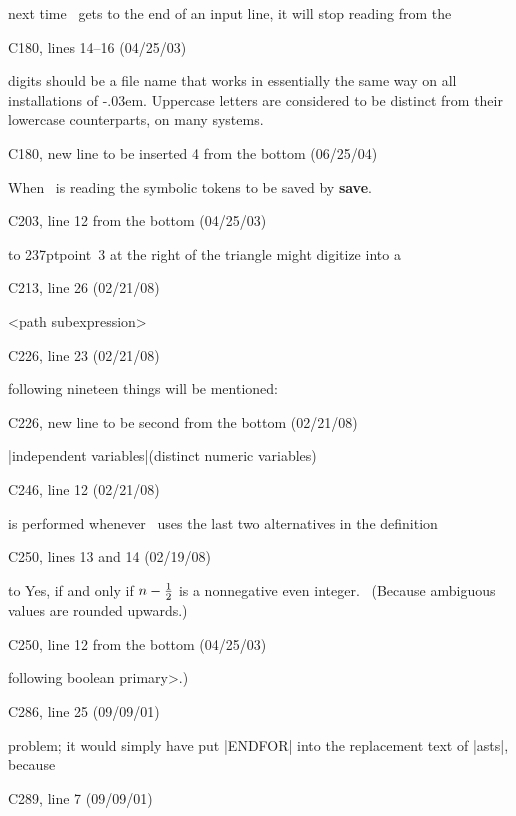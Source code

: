 {{\ninepoint\noindent
next time \MF\ gets to the end of an input line, it will stop reading
from the\cutpar

\bugonpage C180, lines 14--16 (04/25/03)

\ninepoint\noindent
digits should be a
file name that works in essentially the same way on all installations of
\MF\kern-.03em\null. Uppercase letters are considered to be distinct from their
lowercase counterparts, on many systems.

\bugonpage C180, new line to be inserted 4 from the bottom (06/25/04)

\ninepoint\item\bull
When \MF\ is reading the symbolic tokens to be saved by {\bf save}.

\bugonpage C203, line 12 from the bottom (04/25/03)

\ninepoint\hbox to 237pt{point~3 at the right of the triangle
might digitize into a}

\bugonpage C213, line 26 (02/21/08)

\ninepoint\beginsyntax
<path subexpression>\kern-5pt\null
\endsyntax

\bugonpage C226, line 23 (02/21/08)

\ninepoint\noindent following nineteen things will be mentioned:

\bugonpage C226, new line to be second from the bottom (02/21/08)

\ninepoint\indent|independent variables|\qquad(distinct numeric variables)

\bugonpage C246, line 12 (02/21/08)

\ninepoint\noindent
is performed whenever \MF\ uses the last two alternatives
in the definition\cutpar

\bugonpage C250, lines 13 and 14 (02/19/08)

\ninepoint\noindent\hbox to\parindent{\bf\hss19.3.\enspace}%
Yes, if and only if $n-{1\over2}$ is a nonnegative even integer.
\ (Because ambiguous values are rounded upwards.)

\bugonpage C250, line 12 from the bottom (04/25/03)

\ninepoint\noindent
following \<boolean primary>.)

\bugonpage C286, line 25 (09/09/01)

\ninepoint\noindent
problem; it would simply have put |ENDFOR| into the
replacement text of |asts|, because\cutpar

\bugonpage C289, line 7 (09/09/01)

}}
